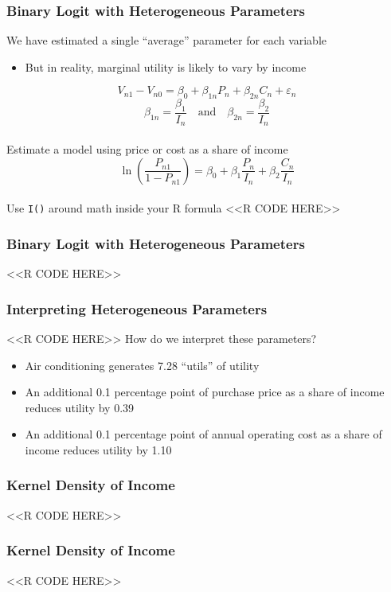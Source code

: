 \documentclass{beamer}
\begin{document}
\begin{frame}[fragile]\frametitle{Binary Logit with Heterogeneous Parameters}
    We have estimated a single ``average'' parameter for each variable
    \begin{itemize}
        \item But in reality, marginal utility is likely to vary by income
    \end{itemize}
    $$V_{n1} - V_{n0} = \beta_0 + \beta_{1n} P_n + \beta_{2n} C_n + \varepsilon_n$$
    $$\beta_{1n} = \frac{\beta_1}{I_n} \quad \text{and} \quad \beta_{2n} = \frac{\beta_2}{I_n}$$ \\
    \vspace{1ex}
    Estimate a model using price or cost as a share of income
    $$\ln \left( \frac{P_{n1}}{1 - P_{n1}} \right) = \beta_0 + \beta_1 \frac{P_n}{I_n} + \beta_2 \frac{C_n}{I_n}$$ \\
    \vspace{1ex}
    Use \texttt{I()} around math inside your R formula
    <<R CODE HERE>>
\end{frame}

\begin{frame}[fragile]\frametitle{Binary Logit with Heterogeneous Parameters}
    <<R CODE HERE>>
\end{frame}

\begin{frame}[fragile]\frametitle{Interpreting Heterogeneous Parameters}
    <<R CODE HERE>>
    \vspace{2ex}
    How do we interpret these parameters?
    \begin{itemize}
        \item Air conditioning generates 7.28 ``utils'' of utility
        \item An additional 0.1 percentage point of purchase price as a share of income reduces utility by 0.39
        \item An additional 0.1 percentage point of annual operating cost as a share of income reduces utility by 1.10
    \end{itemize}
\end{frame}

\begin{frame}[fragile]\frametitle{Kernel Density of Income}
    <<R CODE HERE>>
\end{frame}

\begin{frame}[fragile]\frametitle{Kernel Density of Income}
    <<R CODE HERE>>
\end{frame}
\end{document}
